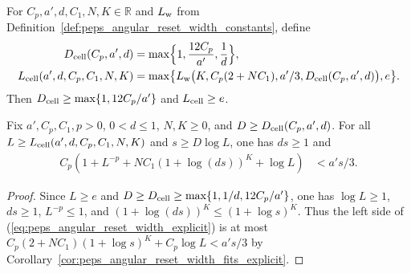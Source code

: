 \begin{definition}
    \label{def:peps_angular_cell_reset_constants}
    \leanok
    For $C_p,a',d,C_1,N,K\in\mathbb R$ and $L_{\rm w}$ from Definition~\ref{def:peps_angular_reset_width_constants}, define
    \begin{align}
        D_{\rm cell}(C_p,a',d)         & =\max\Bigl\{1,\frac{12C_p}{a'},\frac1d\Bigr\},
        \notag                                                                          \\
        L_{\rm cell}(a',d,C_p,C_1,N,K) & =\max\bigl\{L_{\rm w}\bigl(K,C_p(2+NC_1),a'/3,
        D_{\rm cell}(C_p,a',d)\bigr),e\bigr\}.
        \label{eq:peps_angular_cell_reset_constants}
    \end{align}
    Then $D_{\rm cell}\ge\max\{1,12C_p/a'\}$ and $L_{\rm cell}\ge e$.
\end{definition}

\begin{lemma}
    \label{thm:peps_angular_reset_width_of_cell_information_explicit}
    \leanok
    Fix $a',C_p,C_1,p>0$, $0<d\le1$, $N,K\ge0$, and $D\ge D_{\rm cell}(C_p,a',d)$.
    For all $L\ge L_{\rm cell}(a',d,C_p,C_1,N,K)$ and $s\ge D\log L$, one has $ds\ge1$ and
    \begin{align}
        C_p\left(1+L^{-p}+NC_1(1+\log(ds))^K+\log L\right)
         & <a's/3.
        \label{eq:peps_angular_reset_width_explicit}
    \end{align}
\end{lemma}
\begin{proof}\leanok
    Since $L\ge e$ and $D\ge D_{\rm cell}\ge\max\{1,1/d,12C_p/a'\}$, one has $\log L\ge1$, $ds\ge1$, $L^{-p}\le1$, and $(1+\log(ds))^K\le(1+\log s)^K$. Thus the left side of (\ref{eq:peps_angular_reset_width_explicit}) is at most $C_p(2+NC_1)(1+\log s)^K+C_p\log L<a's/3$ by Corollary~\ref{cor:peps_angular_reset_width_fits_explicit}.
\end{proof}

